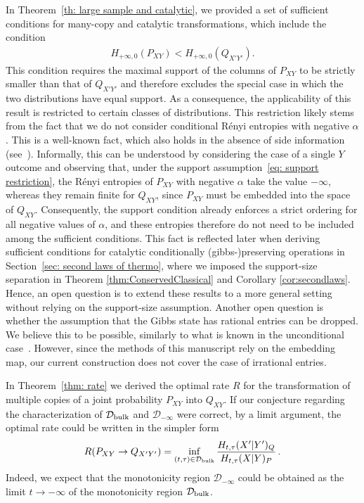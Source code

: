 \documentclass[aps,pra,11pt,onecolumn,nofootinbib,tightenlines]{revtex4-2}
\theoremstyle{definition}
\newcommand{\D}{\mathcal{D}}
\newcommand{\mc}[1]{\mathcal{#1}}
\begin{document}
In Theorem~\ref{th: large sample and catalytic}, we provided a set of sufficient conditions for many-copy and catalytic transformations, which include the condition
\begin{align}
\label{eq: support restriction}
    H_{+\infty,0}(P_{XY}) < H_{+\infty,0}(Q_{X'Y'}) .
\end{align}
This condition requires the maximal support of the columns of $P_{XY}$ to be strictly smaller than that of $Q_{X'Y'}$ and therefore excludes the special case in which the two distributions have equal support.
As a consequence, the applicability of this result is restricted to certain classes of distributions.
 This restriction likely stems from the fact that we do not consider conditional R\'enyi entropies with negative $\alpha$. This is a well-known fact, which also holds in the absence of side information (see~\cite{Jensen_Kjaerulf_2019,farooq2024matrix}).
 Informally, this can be understood by considering the case of a single $Y$ outcome and observing that, under the support assumption~\eqref{eq: support restriction}, the R\'enyi entropies of $P_{XY}$ with negative $\alpha$ take the value $-\infty$, whereas they remain finite for $Q_{XY}$, since $P_{XY}$ must be embedded into the space of $Q_{XY}$. 
Consequently, the support condition already enforces a strict ordering for all negative values of $\alpha$, and these entropies therefore do not need to be included among the sufficient conditions.
This fact is reflected later when deriving sufficient conditions for catalytic conditionally (gibbs-)preserving operations in Section~\ref{sec: second laws of thermo}, where we imposed the support-size separation in Theorem \ref{thm:ConservedClassical} and Corollary \ref{cor:secondlaws}.
Hence, an open question is to extend these results to a more general setting without relying on the support-size assumption.
Another open question is whether the assumption that the Gibbs state has rational entries can be dropped. We believe this to be possible, similarly to what is known in the unconditional case~\cite{farooq2024matrix}. However, since the methods of this manuscript rely on the embedding map, our current construction does not cover the case of irrational entries.


In Theorem~\ref{thm: rate} we derived the optimal rate $R$ for the transformation of multiple copies of a joint probability $P_{XY}$ into $Q_{XY}$. If our conjecture regarding the characterization of $\mc D_{\rm bulk}$ and $\mc D_{-\infty}$ were correct, by a limit argument, the optimal rate could be written in the simpler form
\begin{equation}
R(P_{XY}\rightarrow Q_{X'Y'})=\inf_{(t,\tau)\in\mc D_{\rm bulk}}\frac{H_{t,\tau}(X'|Y')_Q}{H_{t,\tau}(X|Y)_P}\,.
\end{equation}
Indeed, we expect that the monotonicity region $\D_{-\infty}$ could be obtained as the limit $t\to-\infty$ of the monotonicity region $\D_{\rm bulk}$.
\end{document}
